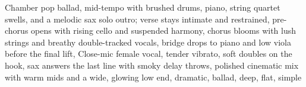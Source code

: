 
\begin{notes}
\end{notes}
\begin{style}
Chamber pop ballad, mid-tempo with brushed drums, piano, string quartet swells, and a melodic sax solo outro; verse stays intimate and restrained, pre-chorus opens with rising cello and suspended harmony, chorus blooms with lush strings and breathy double-tracked vocals, bridge drops to piano and low viola before the final lift, Close-mic female vocal, tender vibrato, soft doubles on the hook, sax answers the last line with smoky delay throws, polished cinematic mix with warm mids and a wide, glowing low end, dramatic, ballad, deep, flat, simple
\end{style}
